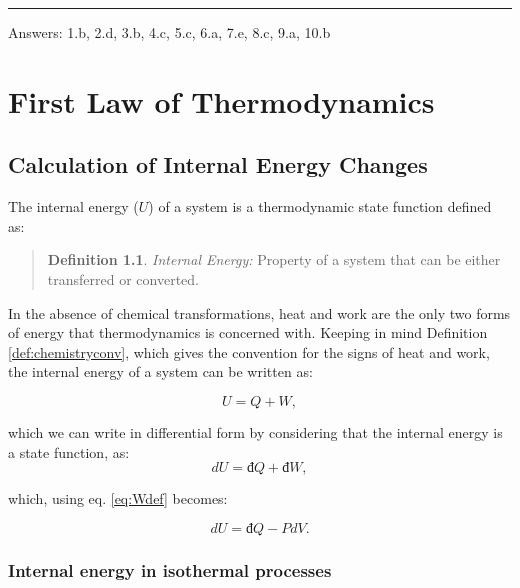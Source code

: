 \documentclass[
  9pt,
]{extbook}
\theoremstyle{definition}
\newtheorem{definition}{Definition}[chapter]
\theoremstyle{definition}
\theoremstyle{definition}
\theoremstyle{remark}
\begin{document}
\begin{center}\rule{0.5\linewidth}{0.5pt}\end{center}

Answers: 1.b, 2.d, 3.b, 4.c, 5.c, 6.a, 7.e, 8.c, 9.a, 10.b

\hypertarget{FirstLaw}{%
\chapter{First Law of Thermodynamics}\label{FirstLaw}}

\hypertarget{energyint}{%
\section{Calculation of Internal Energy Changes}\label{energyint}}

The internal energy (\(U\)) of a system is a thermodynamic state function defined as:

\begin{quote}
\begin{definition}
\protect\hypertarget{def:energy}{}{\label{def:energy} }\emph{Internal Energy:} Property of a system that can be either transferred or converted.
\end{definition}
\end{quote}

In the absence of chemical transformations, heat and work are the only two forms of energy that thermodynamics is concerned with. Keeping in mind Definition \ref{def:chemistryconv}, which gives the convention for the signs of heat and work, the internal energy of a system can be written as:

\begin{equation}
  U = Q + W,
  \label{eq:U}
\end{equation}

which we can write in differential form by considering that the internal energy is a state function, as:
\begin{equation}
  dU = đ Q + đ W,
  \label{eq:dU}
\end{equation}

which, using eq. \eqref{eq:Wdef} becomes:

\begin{equation}
  dU = đ Q - PdV.
  \label{eq:dUpdv}
\end{equation}

\hypertarget{isothermalE}{%
\subsection{Internal energy in isothermal processes}\label{isothermalE}}
\end{document}
